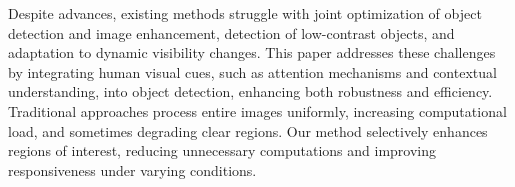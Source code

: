 Despite advances, existing methods struggle with joint optimization of object detection and image enhancement, detection of low-contrast objects, and adaptation to dynamic visibility changes. This paper addresses these challenges by integrating human visual cues, such as attention mechanisms and contextual understanding, into object detection, enhancing both robustness and efficiency. Traditional approaches process entire images uniformly, increasing computational load, and sometimes degrading clear regions. Our method selectively enhances regions of interest, reducing unnecessary computations and improving responsiveness under varying conditions.
